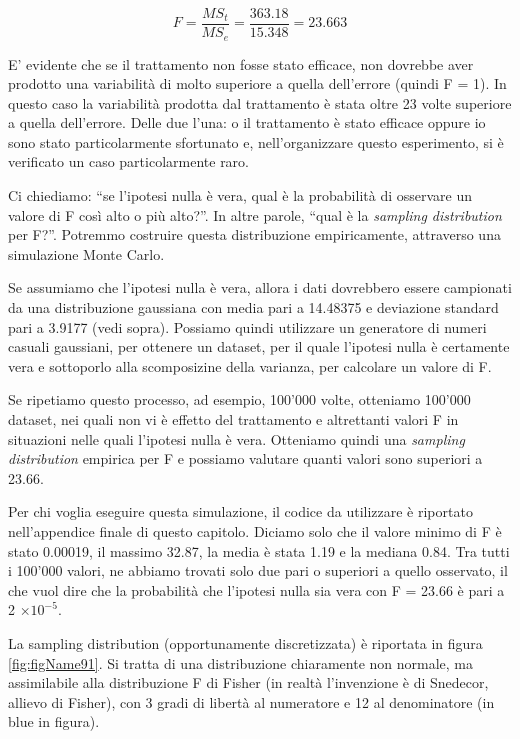\documentclass[a4paper,12pt,oneside]{book}
\begin{document}
\[F = \frac{MS_t}{MS_e} = \frac{363.18}{15.348} = 23.663\]

E' evidente che se il trattamento non fosse stato efficace, non dovrebbe aver prodotto una variabilità di molto superiore a quella dell'errore (quindi F = 1). In questo caso la variabilità prodotta dal trattamento è stata oltre 23 volte superiore a quella dell'errore. Delle due l'una: o il trattamento è stato efficace oppure io sono stato particolarmente sfortunato e, nell'organizzare questo esperimento, si è verificato un caso particolarmente raro.

Ci chiediamo: ``se l'ipotesi nulla è vera, qual è la probabilità di osservare un valore di F così alto o più alto?''. In altre parole, ``qual è la \emph{sampling distribution} per F?''. Potremmo costruire questa distribuzione empiricamente, attraverso una simulazione Monte Carlo.

Se assumiamo che l'ipotesi nulla è vera, allora i dati dovrebbero essere campionati da una distribuzione gaussiana con media pari a 14.48375 e deviazione standard pari a 3.9177 (vedi sopra). Possiamo quindi utilizzare un generatore di numeri casuali gaussiani, per ottenere un dataset, per il quale l'ipotesi nulla è certamente vera e sottoporlo alla scomposizine della varianza, per calcolare un valore di F.

Se ripetiamo questo processo, ad esempio, 100'000 volte, otteniamo 100'000 dataset, nei quali non vi è effetto del trattamento e altrettanti valori F in situazioni nelle quali l'ipotesi nulla è vera. Otteniamo quindi una \emph{sampling distribution} empirica per F e possiamo valutare quanti valori sono superiori a 23.66.

Per chi voglia eseguire questa simulazione, il codice da utilizzare è riportato nell'appendice finale di questo capitolo. Diciamo solo che il valore minimo di F è stato 0.00019, il massimo 32.87, la media è stata 1.19 e la mediana 0.84. Tra tutti i 100'000 valori, ne abbiamo trovati solo due pari o superiori a quello osservato, il che vuol dire che la probabilità che l'ipotesi nulla sia vera con F = 23.66 è pari a 2 \(\times 10^{-5}\).

La sampling distribution (opportunamente discretizzata) è riportata in figura \ref{fig:figName91}. Si tratta di una distribuzione chiaramente non normale, ma assimilabile alla distribuzione F di Fisher (in realtà l'invenzione è di Snedecor, allievo di Fisher), con 3 gradi di libertà al numeratore e 12 al denominatore (in blue in figura).
\end{document}
